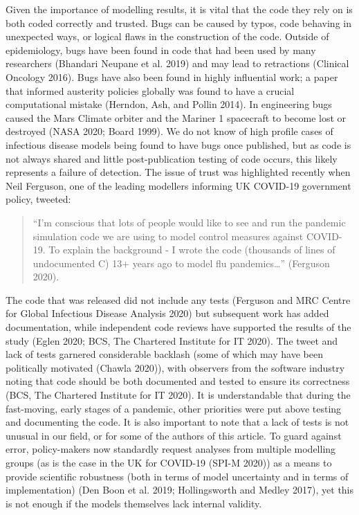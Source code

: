 \documentclass[]{elsarticle} %
\begin{document}
Given the importance of modelling results, it is vital that the code they rely on is both coded correctly and trusted.
Bugs can be caused by typos, code behaving in unexpected ways, or logical flaws in the construction of the code.
Outside of epidemiology, bugs have been found in code that had been used by many researchers (Bhandari Neupane et al. 2019) and may lead to retractions (Clinical Oncology 2016).
Bugs have also been found in highly influential work; a paper that informed austerity policies globally was found to have a crucial computational mistake (Herndon, Ash, and Pollin 2014).
In engineering bugs caused the Mars Climate orbiter and the Mariner 1 spacecraft to become lost or destroyed (NASA 2020; Board 1999).
We do not know of high profile cases of infectious disease models being found to have bugs once published, but as code is not always shared and little post-publication testing of code occurs, this likely represents a failure of detection.
The issue of trust was highlighted recently when Neil Ferguson, one of the leading modellers informing UK COVID-19 government policy, tweeted:

\begin{quote}
``I'm conscious that lots of people would like to see and run the pandemic simulation code we are using to model control measures against COVID-19. To explain the background - I wrote the code (thousands of lines of undocumented C) 13+ years ago to model flu pandemics\ldots{}'' (Ferguson 2020).
\end{quote}

The code that was released did not include any tests (Ferguson and MRC Centre for Global Infectious Disease Analysis 2020) but subsequent work has added documentation, while independent code reviews have supported the results of the study (Eglen 2020; BCS, The Chartered Institute for IT 2020).
The tweet and lack of tests garnered considerable backlash (some of which may have been politically motivated (Chawla 2020)), with observers from the software industry noting that code should be both documented and tested to ensure its correctness (BCS, The Chartered Institute for IT 2020).
It is understandable that during the fast-moving, early stages of a pandemic, other priorities were put above testing and documenting the code.
It is also important to note that a lack of tests is not unusual in our field, or for some of the authors of this article.
To guard against error, policy-makers now standardly request analyses from multiple modelling groups (as is the case in the UK for COVID-19 (SPI-M 2020)) as a means to provide scientific robustness (both in terms of model uncertainty and in terms of implementation) (Den Boon et al. 2019; Hollingsworth and Medley 2017), yet this is not enough if the models themselves lack internal validity.
\end{document}
